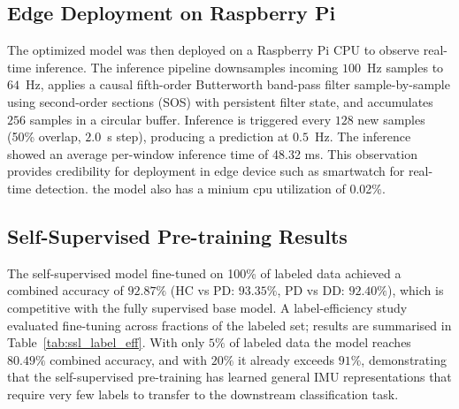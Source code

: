 \documentclass[conference]{IEEEtran}
\begin{document}
\subsection{Edge Deployment on Raspberry Pi}
\label{sec:pi}
The optimized model was then deployed on a Raspberry Pi CPU to observe real-time inference. The inference pipeline downsamples incoming $100$~Hz samples to $64$~Hz, applies a causal fifth-order Butterworth band-pass filter sample-by-sample using second-order sections (SOS) with persistent filter state, and accumulates $256$ samples in a circular buffer. Inference is triggered every $128$ new samples (50\% overlap, $2.0$~s step), producing a prediction at $0.5$~Hz. 
The inference showed an average per-window inference time of 48.32 ms. This observation provides credibility for deployment in edge device such as smartwatch for real-time detection. the model also has a minium cpu utilization of 0.02\%.


\subsection{Self-Supervised Pre-training Results}
The self-supervised model fine-tuned on 100\% of labeled data achieved a combined accuracy of $92.87\%$ (HC vs PD: $93.35\%$, PD vs DD: $92.40\%$), which is competitive with the fully supervised base model. A label-efficiency study evaluated fine-tuning across fractions of the labeled set; results are summarised in Table~\ref{tab:ssl_label_eff}. With only $5\%$ of labeled data the model reaches $80.49\%$ combined accuracy, and with $20\%$ it already exceeds $91\%$, demonstrating that the self-supervised pre-training has learned general IMU representations that require very few labels to transfer to the downstream classification task.
\end{document}
